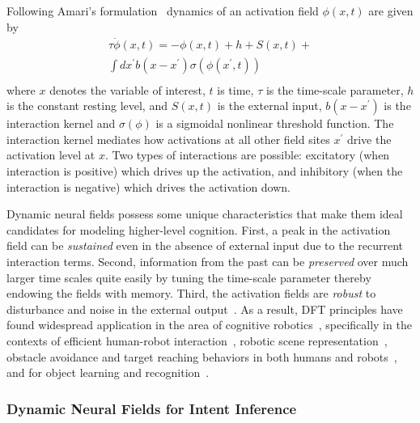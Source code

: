 \documentclass[natbib, twocolumn]{svjour3}          %
\begin{document}
Following Amari's formulation~\citep{amari1977dynamics} dynamics of an activation field $\phi(x, t)$ are given by 
\begin{multline*}
\tau\dot{\phi}(x,t) = -\phi(x,t) + h + S(x,t) + \\ \int\limits_{}^{}dx^{\prime}b(x-x^{\prime})\sigma(\phi(x^{\prime}, t)) 
\end{multline*} 
where $x$ denotes the variable of interest, $t$ is time, $\tau$ is the time-scale parameter, $h$ is the constant resting level, and $S(x,t)$ is the external input, $b(x-x^\prime)$ is the interaction kernel and $\sigma(\phi)$ is a sigmoidal nonlinear threshold function. The interaction kernel mediates how activations at all other field sites $x^\prime$ drive the activation level at $x$. Two types of interactions are possible: excitatory (when interaction is positive) which drives up the activation, and inhibitory (when the interaction is negative) which drives the activation down. 

Dynamic neural fields possess some unique characteristics that make them ideal candidates for modeling higher-level cognition. First, a peak in the activation field can be \textit{sustained} even in the absence of external input due to the recurrent interaction terms. Second, information from the past can be \textit{preserved} over much larger time scales quite easily by tuning the time-scale parameter thereby endowing the fields with memory. Third, the activation fields are \textit{robust} to disturbance and noise in the external output~\citep{schoner2008dynamical}. 
As a result, DFT principles have found widespread application in the area of cognitive robotics~\citep{erlhagen2006dynamic}, specifically in the contexts of efficient human-robot interaction~\citep{erlhagen2014dynamic}, robotic scene representation~\citep{zibner2011dynamic}, obstacle avoidance and target reaching behaviors in both humans and robots~\citep{schoner1995dynamics}, and for object learning and recognition~\citep{faubel2008learning}. 


\subsubsection{Dynamic Neural Fields for Intent Inference}\label{sssec:dft_ii}
\end{document}
